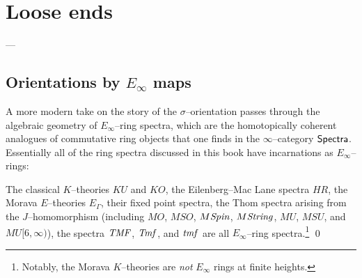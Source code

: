 
\chapter{Loose ends}

---


\section{Orientations by \texorpdfstring{$E_\infty$}{Eoo} maps}









A more modern take on the story of the $\sigma$--orientation passes through the algebraic geometry of $E_\infty$--ring spectra, which are the homotopically coherent analogues of commutative ring objects that one finds in the $\infty$--category $\mathsf{Spectra}$.  Essentially all of the ring spectra discussed in this book have incarnations as $E_\infty$--rings:
\begin{theorem}
The classical $K$--theories $KU$ and $KO$, the Eilenberg--Mac Lane spectra $HR$, the Morava $E$--theories $E_\Gamma$, their fixed point spectra, the Thom spectra arising from the $J$--homomorphism (including $MO$, $MSO$, $M\mathit{Spin}$, $M\mathit{String}$, $MU$, $MSU$, and $MU[6, \infty)$), the spectra $\mathit{TMF}$, $\mathit{Tmf}$, and $\mathit{tmf}$ are all $E_\infty$--ring spectra.\footnote{Notably, the Morava $K$--theories are \emph{not} $E_\infty$ rings at finite heights.} \qed
\end{theorem}


